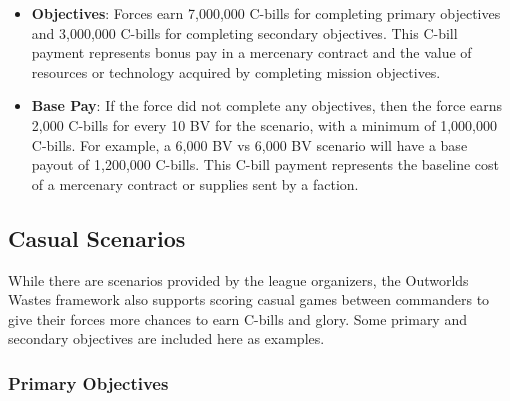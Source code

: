 \documentclass{article}
\begin{document}
\begin{itemize}

\item {\bf Objectives}: Forces earn 7,000,000 C-bills for completing primary objectives and 3,000,000 C-bills for completing secondary objectives.
This C-bill payment represents bonus pay in a mercenary contract and the value of resources or technology acquired by completing mission objectives.

\item {\bf Base Pay}: If the force did not complete any objectives, then the force earns 2,000 C-bills for every 10 BV for the scenario, with a minimum of 1,000,000 C-bills.
For example, a 6,000 BV vs 6,000 BV scenario will have a base payout of 1,200,000 C-bills.
This C-bill payment represents the baseline cost of a mercenary contract or supplies sent by a faction.

\end{itemize}

\subsection{Casual Scenarios}

While there are scenarios provided by the league organizers, the Outworlds Wastes framework also supports scoring casual games between commanders to give their forces more chances to earn C-bills and glory.
Some primary and secondary objectives are included here as examples.\\

\subsubsection{Primary Objectives}
\end{document}
